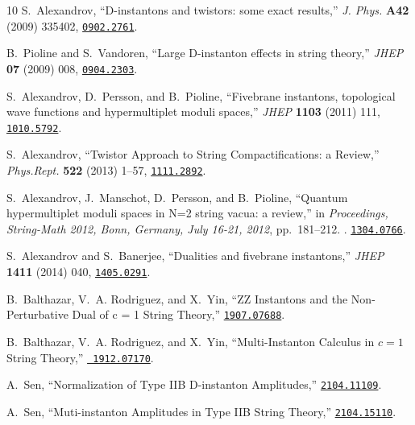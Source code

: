 \documentclass[12pt,a4paper]{article}
\begin{document}
\begin{thebibliography}{10}
	S.~Alexandrov, ``{D-instantons and twistors: some exact results},'' {\em J.
		Phys.} {\bf A42} (2009) 335402,
	\href{http://www.arXiv.org/abs/0902.2761}{{\tt 0902.2761}}.
	
	B.~Pioline and S.~Vandoren, ``{Large D-instanton effects in string theory},''
	{\em JHEP} {\bf 07} (2009) 008,
	\href{http://www.arXiv.org/abs/0904.2303}{{\tt 0904.2303}}.
	
	S.~Alexandrov, D.~Persson, and B.~Pioline, ``{Fivebrane instantons, topological
		wave functions and hypermultiplet moduli spaces},'' {\em JHEP} {\bf 1103}
	(2011) 111, \href{http://www.arXiv.org/abs/1010.5792}{{\tt 1010.5792}}.
	
	S.~Alexandrov, ``{Twistor Approach to String Compactifications: a Review},''
	{\em Phys.Rept.} {\bf 522} (2013) 1--57,
	\href{http://www.arXiv.org/abs/1111.2892}{{\tt 1111.2892}}.
	
	S.~Alexandrov, J.~Manschot, D.~Persson, and B.~Pioline, ``{Quantum
		hypermultiplet moduli spaces in N=2 string vacua: a review},'' in {\em
		{Proceedings, String-Math 2012, Bonn, Germany, July 16-21, 2012}},
	pp.~181--212.
	.
	\newblock
	\href{http://www.arXiv.org/abs/1304.0766}{{\tt 1304.0766}}.
	\newblock
	
	S.~Alexandrov and S.~Banerjee, ``{Dualities and fivebrane instantons},'' {\em
		JHEP} {\bf 1411} (2014) 040,
	\href{http://www.arXiv.org/abs/1405.0291}{{\tt 1405.0291}}.
	
	B.~Balthazar, V.~A. Rodriguez, and X.~Yin, ``{ZZ Instantons and the
		Non-Perturbative Dual of c = 1 String Theory},''
	\href{http://www.arXiv.org/abs/1907.07688}{{\tt 1907.07688}}.
	
	B.~Balthazar, V.~A. Rodriguez, and X.~Yin, ``{Multi-Instanton Calculus in $c =
		1$ String Theory},'' \href{http://www.arXiv.org/abs/1912.07170}{{\tt
			1912.07170}}.
	
	A.~Sen, ``{Normalization of Type IIB D-instanton Amplitudes},''
	\href{http://www.arXiv.org/abs/2104.11109}{{\tt 2104.11109}}.
	
	A.~Sen, ``{Muti-instanton Amplitudes in Type IIB String Theory},''
	\href{http://www.arXiv.org/abs/2104.15110}{{\tt 2104.15110}}.
	

\end{thebibliography}
\end{document}
